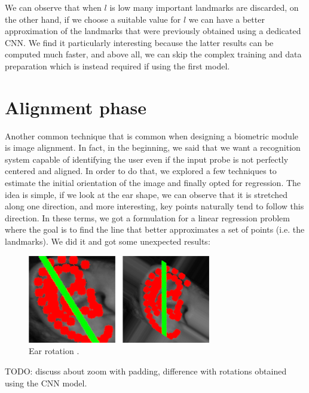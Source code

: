 \documentclass{article}
\begin{document}
We can observe that when $l$ is low many important landmarks are discarded, on the other hand,
if we choose a suitable value for $l$ we can have a better approximation of the landmarks that were previously
obtained using a dedicated CNN. We find it particularly interesting because the latter results can be computed
much faster, and above all, we can skip the complex training and data preparation which is instead required if
using the first model.

\section{Alignment phase}

Another common technique that is common when designing a biometric module is image alignment. In fact,
in the beginning, we said that we want a recognition system capable of identifying the user even if the
input probe is not perfectly centered and aligned. In order to do that, we explored a few techniques to
estimate the initial orientation of the image and finally opted for regression. The idea is simple, if
we look at the ear shape, we can observe that it is stretched along one direction, and more interesting,
key points naturally tend to follow this direction. In these terms, we got a formulation for a linear
regression problem where the goal is to find the line that better approximates a set of points (i.e. the landmarks).
We did it and got some unexpected results:

\begin{figure}[h]
    \begin{center}
        \includegraphics[width=8cm,keepaspectratio]{images/rotation.png}
        \caption{Ear rotation .}
    \end{center}
\end{figure}

TODO: discuss about zoom with padding, difference with rotations obtained using the CNN model.



\end{document}
